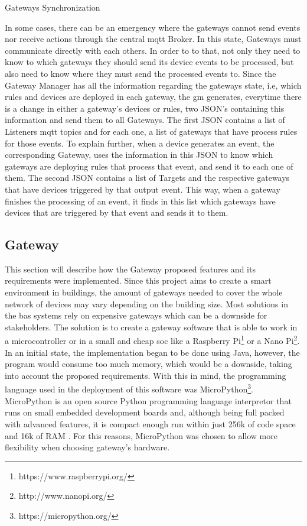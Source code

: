 \begin{Paragraph}{Gateways Synchronization}

In some cases, there can be an emergency where the gateways cannot send events nor receive actions through the central \ac{mqtt} Broker. In this state, Gateways must communicate directly with each others. In order to to that, not only they need to know to which gateways they should send its device events to be processed, but also need to know where they must send the processed events to. Since the Gateway Manager has all the information regarding the gateways state, i.e, which rules and devices are deployed in each gateway, the \ac{gm} generates, everytime there is a change in either a gateway's devices or rules, two JSON's containing this information and send them to all Gateways. The first JSON contains a list of Listeners \ac{mqtt} topics and for each one, a list of gateways that have process rules for those events. To explain further, when a device generates an event, the corresponding Gateway, uses the information in this JSON to know which gateways are deploying rules that process that event, and send it to each one of them. The second JSON contains a list of Targets and the respective gateways that have devices triggered by that output event. This way, when a gateway finishes the processing of an event, it finds in this list which gateways have devices that are triggered by that event and sends it to them.
 
\end{Paragraph}


\subsection{Gateway}
\label{arch:gw}

This section will describe how the Gateway proposed features and its requirements were implemented. Since this project aims to create a smart environment in buildings, the amount of gateways needed to cover the whole network of devices may vary depending on the building size. Most solutions in the \ac{bas} systems rely on expensive gateways which can be a downside for stakeholders. The solution is to create a gateway software that is able to work in a microcontroller or in a small and cheap \ac{soc} like a Raspberry Pi\footnote{https://www.raspberrypi.org/} or a Nano Pi\footnote{http://www.nanopi.org/}. In an initial state, the implementation began to be done using Java, however, the program would consume too much memory, which would be a downside, taking into account the proposed requirements. With this in mind, the programming language used in the deployment of this software was MicroPython\footnote{https://micropython.org/}. MicroPython is an open source Python programming language interpretor that runs on small embedded development boards \cite{micro2} and, although being full packed with advanced features, it is compact enough run within just 256k of code space and 16k of RAM \cite{micro}. For this reasons, MicroPython was chosen to allow more flexibility when choosing gateway's hardware.

